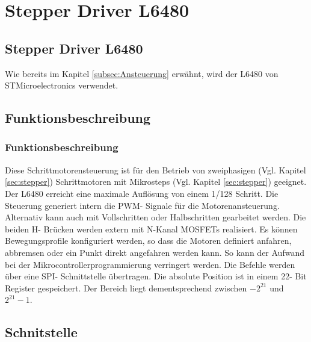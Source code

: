 \ifSTANDALONE
    \section{Stepper Driver L6480} \label{sec:L6480}
\fi
\ifEMBED
    \subsection{Stepper Driver L6480} \label{sec:L6480}
\fi
\ifEMBED
    \BLDCcollab
\fi
Wie bereits im Kapitel \ref*{subsec:Ansteuerung} erwähnt, wird der L6480 von STMicroelectronics verwendet. 

\ifSTANDALONE
    \subsection{Funktionsbeschreibung}
\fi
\ifEMBED
    \subsubsection{Funktionsbeschreibung} 
\fi
    Diese Schrittmotorensteuerung ist für den Betrieb von zweiphasigen (Vgl. 
    Kapitel \ref{sec:stepper}) Schrittmotoren mit Mikrosteps (Vgl. Kapitel 
    \ref{sec:stepper}) geeignet. Der L6480 erreicht eine maximale Auflösung 
    von einem 1/128 Schritt. Die Steuerung generiert intern die PWM- Signale 
    für die Motorenansteuerung. Alternativ kann auch mit Vollschritten oder 
    Halbschritten gearbeitet werden. Die beiden H- Brücken werden extern mit 
    N-Kanal MOSFETs realisiert. Es können Bewegungsprofile konfiguriert 
    werden, so dass die Motoren definiert anfahren, abbremsen oder ein Punkt 
    direkt angefahren werden kann. So kann der Aufwand bei der 
    Mikrocontrollerprogrammierung verringert werden. Die Befehle werden über 
    eine SPI- Schnittstelle übertragen. Die absolute Position ist in einem 22- 
    Bit Register gespeichert. Der Bereich liegt dementsprechend zwischen 
    \(-2^{21}\) und \(2^{21}-1\). \cite{Datasheet:L6480} 

\ifSTANDALONE
    \subsection{Schnitstelle}
\fi
\ifEMBED
